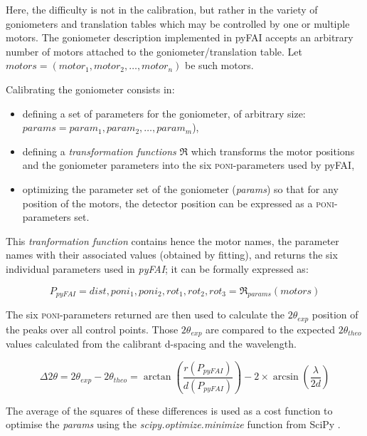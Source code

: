 \documentclass[preprint, pdf]{iucr}              %
\begin{document}
Here, the difficulty is not in the calibration, but rather in the
variety of goniometers and translation tables which may be controlled by one or 
multiple motors.
The goniometer description implemented in pyFAI accepts an
arbitrary number of motors attached to the goniometer/translation table. 
Let $motors = (motor_1, motor_2, \ldots, motor_n)$ be such motors. 

Calibrating the goniometer consists in:
\begin{itemize}
  \item defining a set of parameters for the goniometer, of arbitrary size:
  $params = param_1, param_2, \ldots, param_m$),
  \item defining a \textit{transformation functions} $\Re$ which transforms the motor positions
  and the goniometer parameters into the six \textsc{poni}-parameters used by
  pyFAI,
  \item optimizing the parameter set of the goniometer (\textit{params}) so that
  for any position of the motors, the detector position can be expressed as
  a \textsc{poni}-parameters set.
\end{itemize}

This \textit{tranformation function} contains hence the motor names, the
parameter names with their associated values (obtained by fitting), and returns
the six individual parameters used in \textit{pyFAI}; it can be formally
expressed as:

\begin{equation}
P_{pyFAI} = dist, poni_1, poni_2, rot_1, rot_2, rot_3 = \Re_{params}(motors)
\end{equation}


The six \textsc{poni}-parameters returned 
are then used to
calculate the $2\theta_{exp}$ position of the peaks over all control
points.
Those $2\theta_{exp}$ are compared to
the expected $2\theta_{theo}$ values calculated from the calibrant d-spacing and
the wavelength.

$$
\Delta 2\theta = 2\theta _{exp} - 2\theta _{theo} =
\arctan(\frac{r(P_{pyFAI})}{d(P_{pyFAI})}) -  2 \times
\arcsin(\frac{\lambda}{2d})
$$


The average of the squares of these differences is used as a cost function
to optimise the \textit{params} using the \textit{scipy.optimize.minimize}
function from SciPy \cite{scipy}.
\end{document}
